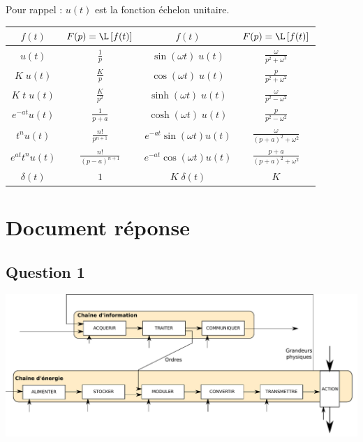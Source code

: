 Pour rappel : $u(t)$ est la fonction échelon unitaire.
\renewcommand\arraystretch{1.3}
\begin{center}
\begin{tabular}{|c|c||c|c|}
	\hline
	$f(t)$			&	$\displaystyle F(p)=\L\left[f(t)\right]$		&	$f(t)$					&	$F(p)=\L\left[f(t)\right]$					\\[0.3cm]
	\hline\hline
	$u(t)$			&	$\displaystyle \frac 1p$				&	$\sin(\omega t)\;u(t)$		&	$\displaystyle \frac{\omega}{p^2+\omega^2}$	\\[0.3cm]
	\hline
	$K\;u(t)$		&	$\displaystyle \frac{K}{p}$			&	$\cos(\omega t)\;u(t)$		&	$\displaystyle \frac{p}{p^2+\omega^2}$		\\[0.3cm]
	\hline
	$K\;t\;u(t)$		&	$\displaystyle \frac K{p^2}$			&	$\sinh(\omega t)\;u(t)$		&	$\displaystyle \frac \omega{p^2-\omega^2}$		\\[0.3cm]
	\hline
	$e^{-at}u(t)$	&	$\displaystyle \frac{1}{p+a}$			&	$\cosh(\omega t)\;u(t)$		&	$\displaystyle \frac{p}{p^2-\omega^2}$		\\[0.3cm]
	\hline
	$t^nu(t)$		&	$\displaystyle \frac{n!}{p^{n+1}}$		&	$e^{-at}\sin(\omega t)u(t)$	&	$\displaystyle \frac \omega{(p+a)^2+\omega^2}$	\\[0.3cm]
	\hline
	$e^{at} t^n u(t)$	&	$\displaystyle \frac{n!}{(p-a)^{n+1}}$		&	$e^{-at}\cos(\omega t) u(t)$	&	$\displaystyle \frac{p+a}{(p+a)^2+\omega^2}$	\\[0.3cm]
	\hline
	$\delta(t)$		&	$1$							&	$K\;\delta(t)$			&	$K$								\\[0.3cm]
	\hline
\end{tabular}
\end{center}

\newpage
\clearpage
\newpage

\section*{Document réponse}

\subsection*{Question 1}
\begin{center}
\includegraphics[width=1.0\textwidth]{images/chaine_fonctionnelle_0.pdf}
\end{center}


